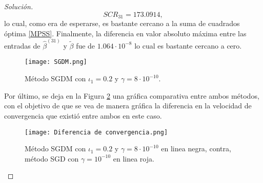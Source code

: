 \documentclass[10.5pt,notitlepage]{article}
\newenvironment{solucion}
  {\begin{proof}[Solución]}
  {\end{proof}}
\theoremstyle{plain}
\begin{document}
\begin{solucion}
\[
SCR_{31} = 173.0914,
\]
lo cual, como era de esperarse, es bastante cercano a la suma de cuadrados óptima \eqref{MPSS}. Finalmente, la diferencia en valor absoluto máxima entre las entradas de \(\hat{\beta}^{(31)}\) y \(\widetilde{\beta}\) fue de \(1.064\cdot 10^{-8}\) lo cual es bastante cercano a cero.  
\begin{figure}[htb]
    \centering
    \texttt{[image: SGDM.png]}
    \caption{Método SGDM con \(\iota_1 = 0.2\) y \(\gamma = 8\cdot 10^{-10}\).}
    \label{fig:4}
\end{figure}
Por último, se deja en la Figura \ref{fig:5} una gráfica comparativa entre ambos métodos, con el objetivo de que se vea de manera gráfica la diferencia en la velocidad de convergencia que existió entre ambos en este caso.
\begin{figure}[htb]
    \centering
    \texttt{[image: Diferencia de convergencia.png]}
    \caption{Método SGDM con \(\iota_1 = 0.2\) y \(\gamma = 8\cdot 10^{-10}\) en linea negra, contra, método SGD con \(\gamma =  10^{-10}\) en linea roja.}
    \label{fig:5}
\end{figure}
\end{solucion}


\newpage
\nocite{*}
\printbibliography
\end{document}
